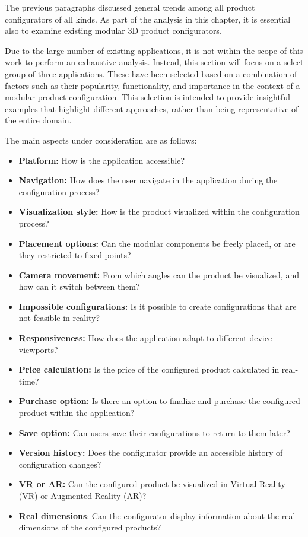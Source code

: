 The previous paragraphs discussed general trends among all product configurators of all kinds. As part of the analysis in this chapter, it is essential also to examine existing modular 3D product configurators. 

Due to the large number of existing applications, it is not within the scope of this work to perform an exhaustive analysis. Instead, this section will focus on a select group of three applications. These have been selected based on a combination of factors such as their popularity, functionality, and importance in the context of a modular product configuration. This selection is intended to provide insightful examples that highlight different approaches, rather than being representative of the entire domain.

\noindent The main aspects under consideration are as follows:\nopagebreak
\begin{itemize}[label=\rectanglebullet]
    \item \textbf{Platform:} How is the application accessible?
    \item \textbf{Navigation:} How does the user navigate in the application during the configuration process?
    \item \textbf{Visualization style:} How is the product visualized within the configuration process?
    \item \textbf{Placement options:} Can the modular components be freely placed, or are they restricted to fixed points?
    \item \textbf{Camera movement:} From which angles can the product be visualized, and how can it switch between them?
    \item \textbf{Impossible configurations:} Is it possible to create configurations that are not feasible in reality?
    \item \textbf{Responsiveness:} How does the application adapt to different device viewports?
    \item \textbf{Price calculation:} Is the price of the configured product calculated in real-time?
    \item \textbf{Purchase option:} Is there an option to finalize and purchase the configured product within the application?
    \item \textbf{Save option:} Can users save their configurations to return to them later?
    \item \textbf{Version history:} Does the configurator provide an accessible history of configuration changes?
    \item \textbf{VR or AR:} Can the configured product be visualized in Virtual Reality (VR) or Augmented Reality (AR)?
    \item \textbf{Real dimensions}: Can the configurator display information about the real dimensions of the configured products? 
\end{itemize}

